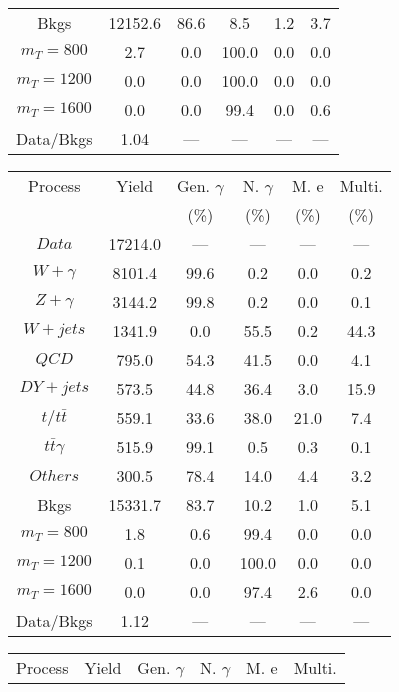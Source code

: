 \begin{figure}
\begin{minipage}[c]{0.32\textwidth}
{\begin{tabular}{cccccc}
Bkgs &  12152.6 &  86.6 &  8.5 &  1.2 &  3.7\\
$ m_{T} = 800 $ &  2.7 &  0.0 &  100.0 &  0.0 &  0.0\\
$ m_{T} = 1200 $ &  0.0 &  0.0 &  100.0 &  0.0 &  0.0\\
$ m_{T} = 1600 $ &  0.0 &  0.0 &  99.4 &  0.0 &  0.6\\
Data/Bkgs &  1.04 &  --- &  --- &  --- &  ---\\
\hline
\end{tabular}
}
\end{minipage}
\begin{minipage}[c]{0.32\textwidth}
\centering
\tiny{
\begin{tabular}{cccccc}
\hline
Process & Yield & Gen. $\gamma$ & N. $\gamma$ & M. e & Multi. \\
 &  & (\%) & (\%) & (\%) & (\%)  \\
\hline
                                                                      $ Data $ &  17214.0 &  --- &  --- &  --- &  ---\\
$ W+\gamma $ &  8101.4 &  99.6 &  0.2 &  0.0 &  0.2\\
$ Z+\gamma $ &  3144.2 &  99.8 &  0.2 &  0.0 &  0.1\\
$ W+jets $ &  1341.9 &  0.0 &  55.5 &  0.2 &  44.3\\
$ QCD $ &  795.0 &  54.3 &  41.5 &  0.0 &  4.1\\
$ DY+jets $ &  573.5 &  44.8 &  36.4 &  3.0 &  15.9\\
$ t/t\bar{t} $ &  559.1 &  33.6 &  38.0 &  21.0 &  7.4\\
$ t\bar{t}\gamma $ &  515.9 &  99.1 &  0.5 &  0.3 &  0.1\\
$ Others $ &  300.5 &  78.4 &  14.0 &  4.4 &  3.2\\
Bkgs &  15331.7 &  83.7 &  10.2 &  1.0 &  5.1\\
$ m_{T} = 800 $ &  1.8 &  0.6 &  99.4 &  0.0 &  0.0\\
$ m_{T} = 1200 $ &  0.1 &  0.0 &  100.0 &  0.0 &  0.0\\
$ m_{T} = 1600 $ &  0.0 &  0.0 &  97.4 &  2.6 &  0.0\\
Data/Bkgs &  1.12 &  --- &  --- &  --- &  ---\\
\hline
\end{tabular}
}
\end{minipage}
\begin{minipage}[c]{0.32\textwidth}
\centering
\tiny{
\begin{tabular}{cccccc}
\hline
Process & Yield & Gen. $\gamma$ & N. $\gamma$ & M. e & Multi. \\

\end{tabular}}
\end{minipage}
\end{figure}
